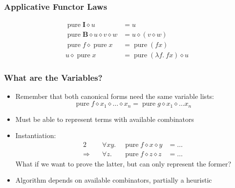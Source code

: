 \documentclass[smaller,leqno]{beamer}
\DeclareMathOperator{\pure}{pure}
\newcommand{\ap}{\diamond}
\begin{document}
\begin{frame}
\frametitle{Applicative Functor Laws}

\begin{align*}
	\tag{identity} \pure{\mathbf{I}} \ap u &= u \\[1ex]
	\tag{composition} \pure{\mathbf{B}} \ap u \ap v \ap w &= u \ap (v \ap w) \\[1ex]
	\tag{homomorphism} \pure{f} \ap \pure x &= \pure{(f x)} \\[1ex]
	\tag{interchange} u \ap \pure{x} &= \pure{(\lambda f.\> f x)} \ap u
\end{align*}
\end{frame}

\begin{frame}
\frametitle{What are the Variables?}

\begin{itemize}
\item Remember that both canonical forms need the same variable lists:
\[ \pure f \ap x_1 \ap \dots \ap x_n = \pure g \ap x_1 \ap \dots x_n \]
\item Must be able to represent terms with available combinators
\item Instantiation:
\begin{alignat*}{2}
	& \forall x y. \; & \pure f \ap x \ap y &= \dots \\
	\Longrightarrow\quad & \forall z. \; & \pure f \ap z \ap z &= \dots
\end{alignat*}
What if we want to prove the latter, but can only represent the former?
\item Algorithm depends on available combinators, partially a heuristic
\end{itemize}
\end{frame}
\end{document}
